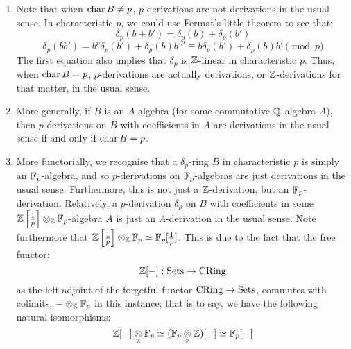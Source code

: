            \begin{remark} \label{remark: arithmetic_and_algebraic_derivations}
                \noindent
                \begin{enumerate}
                    \item Note that when $\operatorname{char} B \not = p$, $p$-derivations are not derivations in the usual sense. In characteristic $p$, we could use Fermat's little theorem to see that:
                    $$\delta_p(b + b') = \delta_p(b) + \delta_p(b')$$
                    $$\delta_p(bb') = b^p\delta_p(b') + \delta_p(b)b'^p \equiv b\delta_p(b') + \delta_p(b)b' \pmod{p}$$
                    The first equation also implies that $\delta_p$ is $\mathbb{Z}$-linear in characteristic $p$. Thus, when $\operatorname{char} B = p$, $p$-derivations are actually derivations, or $\mathbb{Z}$-derivations for that matter, in the usual sense.
                    \item More generally, if $B$ is an $A$-algebra (for some commutative $\mathbb{Q}$-algebra $A$), then $p$-derivations on $B$ with coefficients in $A$ are derivations in the usual sense if and only if $\operatorname{char} B = p$.
                    \item More functorially, we recognise that a $\delta_p$-ring $B$ in characteristic $p$ is simply an $\mathbb{F}_p$-algebra, and so $p$-derivations on $\mathbb{F}_p$-algebras are just derivations in the usual sense. Furthermore, this is not just a $\mathbb{Z}$-derivation, but an $\mathbb{F}_p$-derivation. Relatively, a $p$-derivation $\delta_p$ on $B$ with coefficients in some $\Z\left[\frac1p\right] \tensor_{\Z} \F_p$-algebra $A$ is just an $A$-derivation in the usual sense. Note furthermore that $\Z\left[\frac1p\right] \tensor_{\Z} \F_p \cong \F_p[\frac1p]$. This is due to the fact that the free functor:
                        $$\mathbb{Z}[-]: \mathrm{Sets} \to \mathrm{CRing}$$
                    as the left-adjoint of the forgetful functor $\mathrm{CRing} \to \mathrm{Sets}$, commutes with colimits, $-\tensor_{\Z} \F_p$ in this instance; that is to say, we have the following natural isomorphisms:
                        $$\Z[-] \tensor_{\Z} \F_p \cong (\F_p \tensor_{\Z} \Z)[-] \cong \F_p[-]$$
                \end{enumerate}
            \end{remark}
